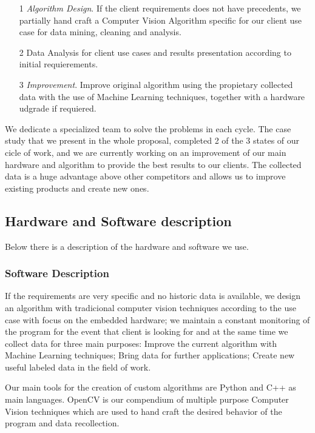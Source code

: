 \begin{itemize}

\item[1] \textit{Algorithm Design}. If the client requirements does not have precedents, we partially hand craft a Computer Vision Algorithm specific for our client use case for data mining, cleaning and analysis.
\item[2] Data Analysis for client use cases and results presentation according to initial requierements.
\item[3] \textit{Improvement}. Improve original algorithm using the propietary collected data with the use of Machine Learning techniques, together with a hardware udgrade if requiered.
     
\end{itemize}

We dedicate a specialized team to solve the problems in each cycle. The case study that we present in the whole proposal, completed 2 of the 3 states of our cicle of work, and we are currently working on an improvement of our main hardware and algorithm to provide the best results to our clients. The collected data is a huge advantage above other competitors and allows us to improve existing products and create new ones.

\subsection{Hardware and Software description}
Below there is a description of the hardware and software we use.

\subsubsection{Software Description}
If the requirements are very specific and no historic data is available, we design an algorithm with tradicional computer vision techniques according to the use case with focus on the embedded hardware; we maintain a constant monitoring of the program for the event that client is looking for and at the same time we collect data for three main purposes: Improve the current algorithm with Machine Learning techniques; Bring data for further applications; Create new useful labeled data in the field of work.

Our main tools for the creation of custom algorithms are Python and C++ as main languages. OpenCV is our compendium of multiple purpose Computer Vision techniques which are used to hand craft the desired behavior of the program and data recollection.

